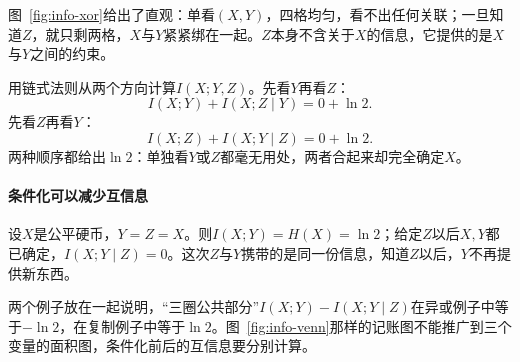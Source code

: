 图~\ref{fig:info-xor}给出了直观：单看$(X,Y)$，四格均匀，看不出任何关联；一旦知道$Z$，就只剩两格，$X$与$Y$紧紧绑在一起。$Z$本身不含关于$X$的信息，它提供的是$X$与$Y$之间的约束。

用链式法则从两个方向计算$I(X;Y,Z)$。先看$Y$再看$Z$：
\[
  I(X;Y)+I(X;Z\mid Y)=0+\ln2.
\]
先看$Z$再看$Y$：
\[
  I(X;Z)+I(X;Y\mid Z)=0+\ln2.
\]
两种顺序都给出$\ln2$：单独看$Y$或$Z$都毫无用处，两者合起来却完全确定$X$。

\paragraph{条件化可以减少互信息}
设$X$是公平硬币，$Y=Z=X$。则$I(X;Y)=H(X)=\ln2$；给定$Z$以后$X,Y$都已确定，$I(X;Y\mid Z)=0$。这次$Z$与$Y$携带的是同一份信息，知道$Z$以后，$Y$不再提供新东西。

两个例子放在一起说明，“三圈公共部分”$I(X;Y)-I(X;Y\mid Z)$在异或例子中等于$-\ln2$，在复制例子中等于$\ln2$。图~\ref{fig:info-venn}那样的记账图不能推广到三个变量的面积图，条件化前后的互信息要分别计算。
